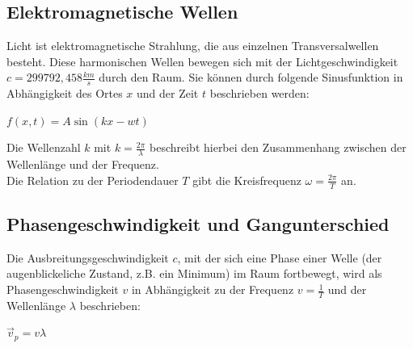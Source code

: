 \documentclass[12pt,a4paper,titlepage,headinclude,bibtotoc]{scrartcl}
\begin{document}
\subsection{Elektromagnetische Wellen}
Licht ist elektromagnetische Strahlung, die aus einzelnen Transversalwellen besteht. Diese harmonischen Wellen bewegen sich mit der Lichtgeschwindigkeit $c= 299 792,458 \frac{km}{s}$ durch den Raum. Sie können durch folgende Sinusfunktion in Abhängigkeit des Ortes $x$ und der Zeit $t$ beschrieben werden:
\\
\par %
$f(x,t)= A\sin(kx-wt)$
\\
\par

Die Wellenzahl $k$ mit $k=\frac{2\pi}{\lambda}$ beschreibt hierbei den Zusammenhang zwischen der Wellenlänge und der Frequenz. \\
Die Relation zu der Periodendauer $T$ gibt die Kreisfrequenz $\omega =\frac{2\pi}{T} $ an.  








\subsection{Phasengeschwindigkeit und Gangunterschied}
Die Ausbreitungsgeschwindigkeit $c$, mit der sich eine Phase einer Welle (der augenblickeliche Zustand, z.B. ein Minimum) im Raum fortbewegt, wird als Phasengeschwindigkeit $v$ in Abhängigkeit zu der Frequenz $v=\frac{1}{T}$ und der Wellenlänge $\lambda$ beschrieben:\\
\par
$\vec{v}_p = v\lambda$
\\
\par
\end{document}
